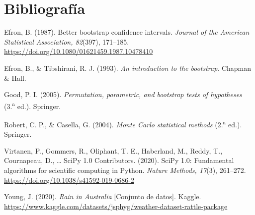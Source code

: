 \documentclass[11pt,a4paper]{article}
\begin{document}
\section*{Bibliografía}
\small
\setlength{\parindent}{-1.2em}\setlength{\leftskip}{1.2em}
Efron, B. (1987). Better bootstrap confidence intervals. \textit{Journal of the American Statistical Association, 82}(397), 171--185. \url{https://doi.org/10.1080/01621459.1987.10478410}

Efron, B., \& Tibshirani, R. J. (1993). \textit{An introduction to the bootstrap}. Chapman \& Hall.

Good, P. I. (2005). \textit{Permutation, parametric, and bootstrap tests of hypotheses} (3.\textsuperscript{a} ed.). Springer.

Robert, C. P., \& Casella, G. (2004). \textit{Monte Carlo statistical methods} (2.\textsuperscript{a} ed.). Springer.

Virtanen, P., Gommers, R., Oliphant, T. E., Haberland, M., Reddy, T., Cournapeau, D., \ldots{} SciPy 1.0 Contributors. (2020). SciPy 1.0: Fundamental algorithms for scientific computing in Python. \textit{Nature Methods, 17}(3), 261--272. \url{https://doi.org/10.1038/s41592-019-0686-2}

Young, J. (2020). \textit{Rain in Australia} [Conjunto de datos]. Kaggle. \url{https://www.kaggle.com/datasets/jsphyg/weather-dataset-rattle-package}
\end{document}
